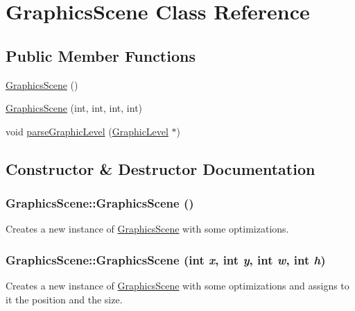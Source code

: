 \hypertarget{classGraphicsScene}{
\section{GraphicsScene Class Reference}
\label{classGraphicsScene}
}
\subsection*{Public Member Functions}
\begin{DoxyCompactItemize}
\item 
\hyperlink{classGraphicsScene_a5a6ac24fb693cce13e3d69c0c38311c9}{GraphicsScene} ()
\item 
\hyperlink{classGraphicsScene_af09521be2e8ca1c9d398b9a47c9035a9}{GraphicsScene} (int, int, int, int)
\item 
void \hyperlink{classGraphicsScene_aaa5f151c3024d754665c7af92670592f}{parseGraphicLevel} (\hyperlink{classGraphicLevel}{GraphicLevel} $\ast$)
\end{DoxyCompactItemize}


\subsection{Constructor \& Destructor Documentation}
\hypertarget{classGraphicsScene_a5a6ac24fb693cce13e3d69c0c38311c9}{
\subsubsection[{GraphicsScene}]{\setlength{\rightskip}{0pt plus 5cm}GraphicsScene::GraphicsScene ()}}
\label{classGraphicsScene_a5a6ac24fb693cce13e3d69c0c38311c9}
Creates a new instance of \hyperlink{classGraphicsScene}{GraphicsScene} with some optimizations. \hypertarget{classGraphicsScene_af09521be2e8ca1c9d398b9a47c9035a9}{
\subsubsection[{GraphicsScene}]{\setlength{\rightskip}{0pt plus 5cm}GraphicsScene::GraphicsScene (int {\em x}, \/  int {\em y}, \/  int {\em w}, \/  int {\em h})}}
\label{classGraphicsScene_af09521be2e8ca1c9d398b9a47c9035a9}
Creates a new instance of \hyperlink{classGraphicsScene}{GraphicsScene} with some optimizations and assigns to it the position and the size. 

